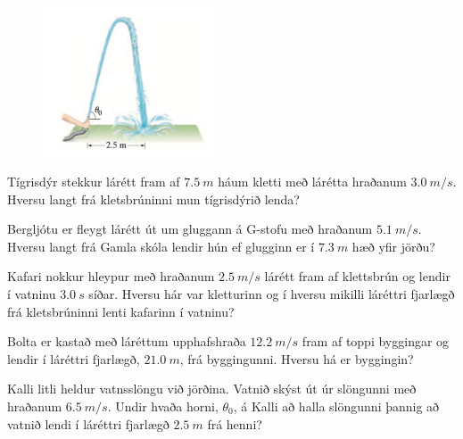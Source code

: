 \ifdefined \wholebook \else\documentclass[oneside]{book}\usepackage{EdlBook}\graphicspath{{figures/}}
\begin{document}
\begin{enumerate}[label = \textbf{Dæmi \thechapter.\arabic*.}]

\begin{minipage}{\linewidth}

\begin{figure}
\vspace{-1cm}
\includegraphics[width=2in]{images/slanga.png}
\end{figure}

\item Tígrisdýr stekkur lárétt fram af $\SI{7.5}{m}$ háum kletti með lárétta hraðanum $\SI{3.0}{m/s}$. Hversu langt frá kletsbrúninni mun tígrisdýrið lenda?


\item Bergljótu er fleygt lárétt út um gluggann á G-stofu með hraðanum $\SI{5.1}{m/s}$. Hversu langt frá Gamla skóla lendir hún ef glugginn er í $\SI{7.3}{m}$ hæð yfir jörðu?

\item Kafari nokkur hleypur með hraðanum $\SI{2.5}{m/s}$ lárétt fram af klettsbrún og lendir í vatninu $\SI{3.0}{s}$ síðar. Hversu hár var kletturinn og í hversu mikilli láréttri fjarlægð frá kletsbrúninni lenti kafarinn í vatninu?

\item Bolta er kastað með láréttum upphafshraða $\SI{12.2}{m/s}$ fram af toppi byggingar og lendir í láréttri fjarlægð, $\SI{21.0}{m}$, frá byggingunni. Hversu há er byggingin?


\item Kalli litli heldur vatnsslöngu við jörðina. Vatnið skýst út úr slöngunni með hraðanum $\SI{6.5}{m/s}$. Undir hvaða horni, $\theta_0$, á Kalli að halla slöngunni þannig að vatnið lendi í láréttri fjarlægð $\SI{2.5}{m}$ frá henni?

\end{minipage}

\begin{minipage}{\linewidth}

\begin{figure}


\end{figure}
\end{minipage}
\end{enumerate}
\end{document}
